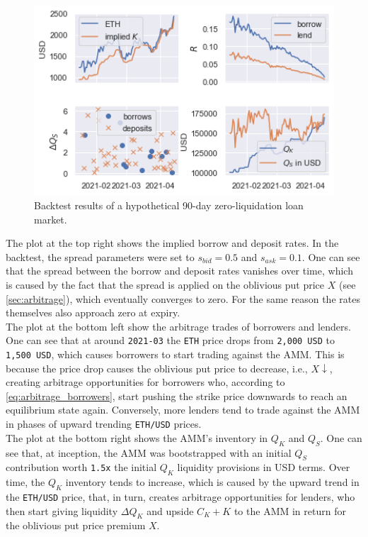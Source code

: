 \documentclass[a4paper]{article}
\begin{document}
\begin{figure}
    \centering
    \includegraphics[width=1.0\textwidth]{figures/simulation_3M_4.png}
    \cprotect\caption{\small Backtest results of a hypothetical 90-day zero-liquidation loan market.}
    \label{fig:simulation}
\end{figure}

The plot at the top right shows the implied borrow and deposit rates. In the backtest, the spread parameters were set to $s_{bid}=0.5$ and $s_{ask}=0.1$. One can see that the spread between the borrow and deposit rates vanishes over time, which is caused by the fact that the spread is applied on the oblivious put price $X$ (see \cref{sec:arbitrage}), which eventually converges to zero. For the same reason the rates themselves also approach zero at expiry.\\

The plot at the bottom left show the arbitrage trades of borrowers and lenders. One can see that at around \verb|2021-03| the \verb|ETH| price drops from \verb|2,000 USD| to \verb|1,500 USD|, which causes borrowers to start trading against the AMM. This is because the price drop causes the oblivious put price to decrease, i.e., $X\downarrow$, creating arbitrage opportunities for borrowers who, according to \cref{eq:arbitrage_borrowers}, start pushing the strike price downwards to reach an equilibrium state again. Conversely, more lenders tend to trade against the AMM in phases of upward trending \verb|ETH/USD| prices.\\

The plot at the bottom right shows the AMM's inventory in $Q_K$ and $Q_S$. One can see that, at inception, the AMM was bootstrapped with an initial $Q_S$ contribution worth \verb|1.5x| the initial $Q_K$ liquidity provisions in USD terms. Over time, the $Q_K$ inventory tends to increase, which is caused by the upward trend in the \verb|ETH/USD| price, that, in turn, creates arbitrage opportunities for lenders, who then start giving liquidity $\Delta Q_K$ and upside $C_K+K$ to the AMM in return for the oblivious put price premium $X$.\\
\end{document}

